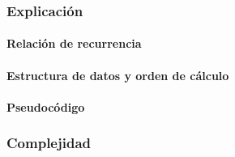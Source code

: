\subsubsection{Explicación}

\paragraph{Relación de recurrencia}

\paragraph{Estructura de datos y orden de cálculo}

\paragraph{Pseudocódigo}

\subsubsection{Complejidad}
